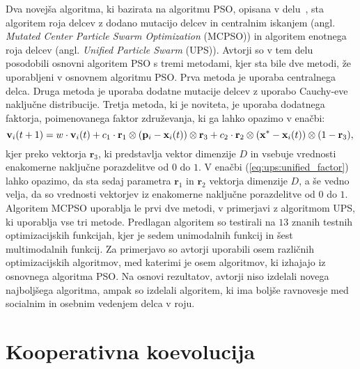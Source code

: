 Dva novejša algoritma, ki bazirata na algoritmu PSO, opisana v delu~\cite{alg:mcupso}, sta algoritem roja delcev z dodano mutacijo delcev in centralnim iskanjem (angl. \textit{Mutated Center Particle Swarm Optimization} (MCPSO)) in algoritem enotnega roja delcev (angl. \textit{Unified Particle Swarm} (UPS)).
Avtorji so v tem delu posodobili osnovni algoritem PSO s tremi metodami, kjer sta bile dve metodi, že uporabljeni v osnovnem algoritmu PSO.
Prva metoda je uporaba centralnega delca.
Druga metoda je uporaba dodatne mutacije delcev z uporabo Cauchy-eve naključne distribucije.
Tretja metoda, ki je noviteta, je uporaba dodatnega faktorja, poimenovanega faktor združevanja, ki ga lahko opazimo v enačbi:
\begin{equation}
    \mathbf{v}_i(t + 1) = w \cdot \mathbf{v}_i(t) + c_1 \cdot \mathbf{r}_1 \otimes (\mathbf{p}_i - \mathbf{x}_i(t)) \otimes \mathbf{r}_3 + c_2 \cdot \mathbf{r}_2 \otimes (\mathbf{x}^* - \mathbf{x}_i(t)) \otimes (1 - \mathbf{r}_3), \label{eq:ups:unified_factor} \\
\end{equation}
kjer preko vektorja $\mathbf{r}_3$, ki predstavlja vektor dimenzije $\mathit{D}$ in vsebuje vrednosti enakomerne naključne porazdelitve od $0$ do $1$.
V enačbi (\ref{eq:ups:unified_factor}) lahko opazimo, da sta sedaj parametra $\mathbf{r}_1$ in $\mathbf{r}_2$ vektorja dimenzije $\mathit{D}$, a še vedno velja, da so vrednosti vektorjev iz enakomerne naključne porazdelitve od $0$ do $1$.
Algoritem MCPSO uporablja le prvi dve metodi, v primerjavi z algoritmom UPS, ki uporablja vse tri metode.
Predlagan algoritem so testirali na $13$ znanih testnih optimizacijskih funkcijah, kjer je sedem unimodalnih funkcij in šest multimodalnih funkcij.
Za primerjavo so avtorji uporabili osem različnih optimizacijskih algoritmov, med katerimi je osem algoritmov, ki izhajajo iz osnovnega algoritma PSO.
Na osnovi rezultatov, avtorji niso izdelali novega najboljšega algoritma, ampak so izdelali algoritem, ki ima boljše ravnovesje med socialnim in osebnim vedenjem delca v roju.

\section{Kooperativna koevolucija}

